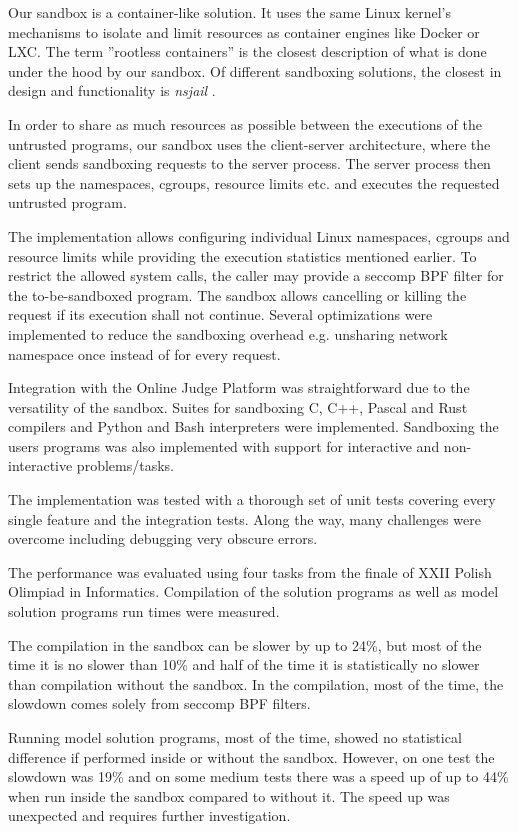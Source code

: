 \documentclass[en]{pracamgr}
\begin{document}
Our sandbox is a container-like solution. It uses the same Linux kernel's mechanisms to isolate and limit resources as container engines like Docker or LXC. The term ''rootless containers'' is the closest description of what is done under the hood by our sandbox. Of different sandboxing solutions, the closest in design and functionality is \textit{nsjail} \cite{google/nsjail}.

In order to share as much resources as possible between the executions of the untrusted programs, our sandbox uses the client-server architecture, where the client sends sandboxing requests to the server process. The server process then sets up the namespaces, cgroups, resource limits etc. and executes the requested untrusted program.

The implementation allows configuring individual Linux namespaces, cgroups and resource limits while providing the execution statistics mentioned earlier. To restrict the allowed system calls, the caller may provide a seccomp BPF filter for the to-be-sandboxed program. The sandbox allows cancelling or killing the request if its execution shall not continue. Several optimizations were implemented to reduce the sandboxing overhead e.g. unsharing network namespace once instead of for every request.

Integration with the Online Judge Platform was straightforward due to the versatility of the sandbox. Suites for sandboxing C, C++, Pascal and Rust compilers and Python and Bash interpreters were implemented. Sandboxing the users programs was also implemented with support for interactive and non-interactive problems/tasks.

The implementation was tested with a thorough set of unit tests covering every single feature and the integration tests. Along the way, many challenges were overcome including debugging very obscure errors.

The performance was evaluated using four tasks from the finale of XXII Polish Olimpiad in Informatics. Compilation of the solution programs as well as model solution programs run times were measured.

The compilation in the sandbox can be slower by up to 24\%, but most of the time it is no slower than 10\% and half of the time it is statistically no slower than
compilation without the sandbox. In the compilation, most of the time, the slowdown comes solely from seccomp BPF filters.

Running model solution programs, most of the time, showed no statistical difference if performed inside or without the sandbox. However, on one test the slowdown was 19\% and on some medium tests there was a speed up of up to 44\% when run inside the sandbox compared to without it. The speed up was unexpected and requires further investigation.
\end{document}
